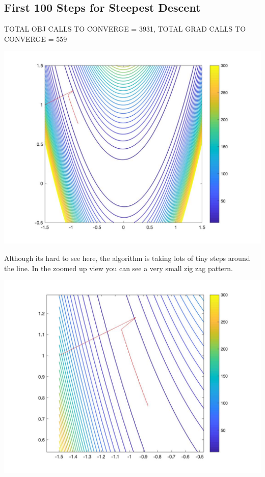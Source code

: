 \documentclass[a4paper]{article}
\begin{document}
        \subsection{First 100 Steps for Steepest Descent}       
        TOTAL OBJ CALLS TO CONVERGE = 3931,
        TOTAL GRAD CALLS TO CONVERGE = 559
        \begin{center}
            \includegraphics[scale=0.3]{images/SDRosenbrock.jpg}
        \end{center}
        Although its hard to see here, the algorithm is taking lots of tiny steps around the line. 
        In the zoomed up view you can see a very small zig zag pattern.
        \begin{center}
            \includegraphics[scale=0.45]{images/closeup.jpg}
        \end{center}
\end{document}
